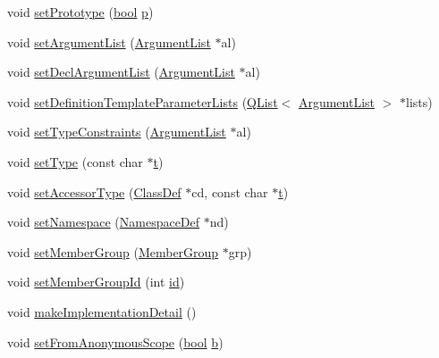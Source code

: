 \begin{DoxyCompactItemize}
\item 
void \hyperlink{class_member_def_ab3c36fa8291589cf3b5d071044d1ba5f}{set\+Prototype} (\hyperlink{qglobal_8h_a1062901a7428fdd9c7f180f5e01ea056}{bool} \hyperlink{060__command__switch_8tcl_a15229b450f26d8fa1c10bea4f3279f4d}{p})
\item 
void \hyperlink{class_member_def_a5c55ef409d18fc50c374554eacb36583}{set\+Argument\+List} (\hyperlink{class_argument_list}{Argument\+List} $\ast$al)
\item 
void \hyperlink{class_member_def_a7bbb6e2413e2ff280adee70b31ce06c8}{set\+Decl\+Argument\+List} (\hyperlink{class_argument_list}{Argument\+List} $\ast$al)
\item 
void \hyperlink{class_member_def_a7c29d9839b089978817fcd155964a9b7}{set\+Definition\+Template\+Parameter\+Lists} (\hyperlink{class_q_list}{Q\+List}$<$ \hyperlink{class_argument_list}{Argument\+List} $>$ $\ast$lists)
\item 
void \hyperlink{class_member_def_aa6281d047fccf97ecafdcc319afb3d79}{set\+Type\+Constraints} (\hyperlink{class_argument_list}{Argument\+List} $\ast$al)
\item 
void \hyperlink{class_member_def_a8e7b72ff6ab51a0e4ed6da73a67f17ca}{set\+Type} (const char $\ast$\hyperlink{058__bracket__recursion_8tcl_a69e959f6901827e4d8271aeaa5fba0fc}{t})
\item 
void \hyperlink{class_member_def_a1c9f50c30b0477ff25e43cf989b21088}{set\+Accessor\+Type} (\hyperlink{class_class_def}{Class\+Def} $\ast$cd, const char $\ast$\hyperlink{058__bracket__recursion_8tcl_a69e959f6901827e4d8271aeaa5fba0fc}{t})
\item 
void \hyperlink{class_member_def_ab3e985bd6ea55fdec7e111d0c657391f}{set\+Namespace} (\hyperlink{class_namespace_def}{Namespace\+Def} $\ast$nd)
\item 
void \hyperlink{class_member_def_a80790640122e12a3aec24f6f71d1479a}{set\+Member\+Group} (\hyperlink{class_member_group}{Member\+Group} $\ast$grp)
\item 
void \hyperlink{class_member_def_aff606a06a83e3c7b19225ff9ec7c0515}{set\+Member\+Group\+Id} (int \hyperlink{class_definition_a19d4680f1998fc384e37c90106a4ed61}{id})
\item 
void \hyperlink{class_member_def_a5dcc96e0a4082fa0fd115a42d68b8d5f}{make\+Implementation\+Detail} ()
\item 
void \hyperlink{class_member_def_aed549a699052b1427a768c7fc40f1408}{set\+From\+Anonymous\+Scope} (\hyperlink{qglobal_8h_a1062901a7428fdd9c7f180f5e01ea056}{bool} \hyperlink{060__command__switch_8tcl_a68bdb74c144118d936931c46f75d4b3e}{b})

\end{DoxyCompactItemize}
